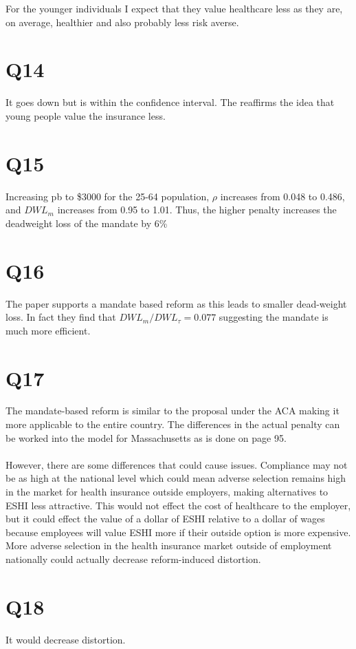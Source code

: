 \documentclass[11pt]{article}
\begin{document}
For the younger individuals I expect that they value healthcare less as they are, on average, healthier and also probably less risk averse. 

\section{Q14}
It goes down but is within the confidence interval. The reaffirms the idea that young people value the insurance less. 

\section{Q15}
 Increasing pb to \$3000 for the 25-64 population, $\rho$ increases from 0.048 to 0.486, and $DWL_m$ increases from 0.95 to 1.01. Thus, the higher penalty increases the deadweight loss of the mandate by 6\% 

\section{Q16}
The paper supports a mandate based reform as this leads to smaller dead-weight loss. In fact they find that $DWL_m/DWL_{\tau} = 0.077$ suggesting the mandate is much more efficient. 

\section{Q17}
The mandate-based reform is similar to the proposal under the ACA making it more applicable to the entire country. The differences in the actual penalty can be worked into the model for Massachusetts as is done on page 95.
\\ \\
However, there are some differences that could cause issues. Compliance may not be as high at the national level which could mean adverse selection remains high in the market for health insurance outside employers, making alternatives to ESHI less attractive. This would not effect the cost of healthcare to the employer, but it could effect the value of a dollar of ESHI relative to a dollar of wages because employees will value ESHI more if their outside option is more expensive. More adverse selection in the health insurance market outside of employment nationally could actually decrease reform-induced distortion. 

\section{Q18}
It would decrease distortion. 
\end{document}
